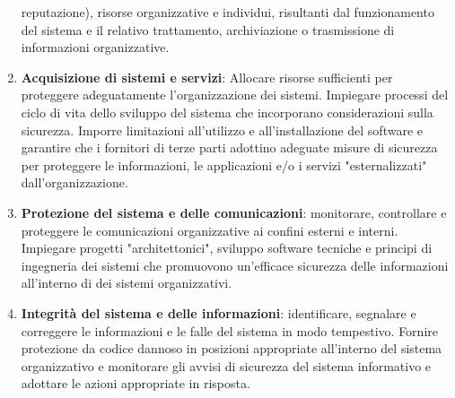 \begin{enumerate}
          reputazione), risorse organizzative e individui, risultanti dal funzionamento
          del sistema e il relativo trattamento, archiviazione o trasmissione di
          informazioni organizzative.
    \item \textbf{Acquisizione di sistemi e servizi}: Allocare risorse sufficienti
          per proteggere adeguatamente l'organizzazione dei sistemi. Impiegare
          processi del ciclo di vita dello sviluppo del sistema che incorporano
          considerazioni sulla sicurezza. Imporre limitazioni all'utilizzo e
          all'installazione del software e garantire che i fornitori di terze parti
          adottino adeguate misure di sicurezza per proteggere le informazioni, le
          applicazioni e/o i servizi "esternalizzati" dall'organizzazione.
    \item \textbf{Protezione del sistema e delle comunicazioni}: monitorare,
          controllare e proteggere le comunicazioni organizzative ai confini
          esterni e interni. Impiegare progetti "architettonici", sviluppo software
          tecniche e principi di ingegneria dei sistemi che promuovono un'efficace
          sicurezza delle informazioni all'interno di dei sistemi organizzativi.
    \item \textbf{Integrità del sistema e delle informazioni}: identificare,
          segnalare e correggere le informazioni e le falle del sistema in modo
          tempestivo. Fornire protezione da codice dannoso in posizioni appropriate
          all'interno del sistema organizzativo e monitorare gli avvisi di sicurezza
          del sistema informativo e adottare le azioni appropriate in risposta.
\end{enumerate}